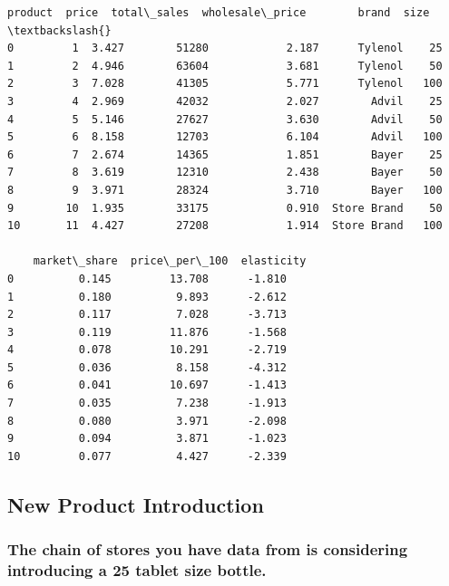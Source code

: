 \documentclass[11pt]{article}
\makeatletter
\newcommand{\boxspacing}{\kern\kvtcb@left@rule\kern\kvtcb@boxsep}
\newcommand{\prompt}[4]{
        {\ttfamily\llap{{\color{#2}[#3]:\hspace{3pt}#4}}\vspace{-\baselineskip}}
    }
\makeatother
\begin{document}
            \begin{tcolorbox}[breakable, size=fbox, boxrule=.5pt, pad at break*=1mm, opacityfill=0]
\prompt{Out}{outcolor}{38}{\boxspacing}
\begin{Verbatim}[commandchars=\\\{\}]
    product  price  total\_sales  wholesale\_price        brand  size  \textbackslash{}
0         1  3.427        51280            2.187      Tylenol    25
1         2  4.946        63604            3.681      Tylenol    50
2         3  7.028        41305            5.771      Tylenol   100
3         4  2.969        42032            2.027        Advil    25
4         5  5.146        27627            3.630        Advil    50
5         6  8.158        12703            6.104        Advil   100
6         7  2.674        14365            1.851        Bayer    25
7         8  3.619        12310            2.438        Bayer    50
8         9  3.971        28324            3.710        Bayer   100
9        10  1.935        33175            0.910  Store Brand    50
10       11  4.427        27208            1.914  Store Brand   100

    market\_share  price\_per\_100  elasticity
0          0.145         13.708      -1.810
1          0.180          9.893      -2.612
2          0.117          7.028      -3.713
3          0.119         11.876      -1.568
4          0.078         10.291      -2.719
5          0.036          8.158      -4.312
6          0.041         10.697      -1.413
7          0.035          7.238      -1.913
8          0.080          3.971      -2.098
9          0.094          3.871      -1.023
10         0.077          4.427      -2.339
\end{Verbatim}
\end{tcolorbox}
        
    \subsection{New Product Introduction}\label{new-product-introduction}

\subsubsection*{The chain of stores you have data from is considering
introducing a 25 tablet size
bottle.}\label{the-chain-of-stores-you-have-data-from-is-considering-introducing-a-25-tablet-size-bottle.}
\end{document}
